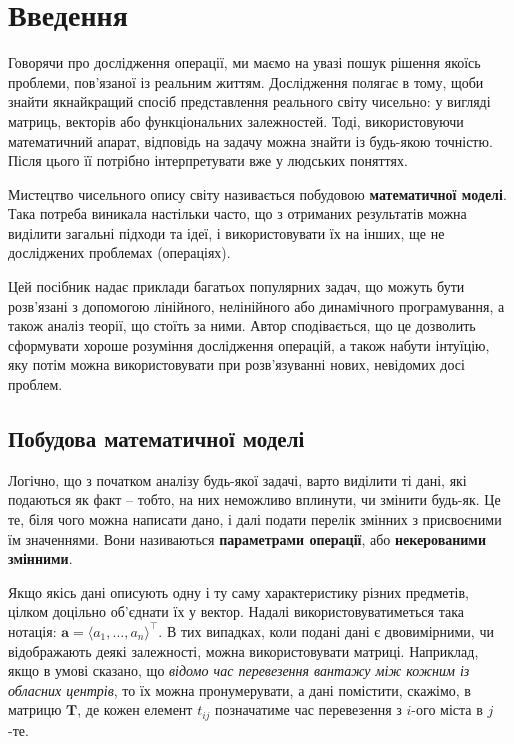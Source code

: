 \documentclass[../book.tex]{subfiles}
\begin{document}
\chapter{Введення}

Говорячи про \flqq{}дослідження операції\frqq{}, ми маємо на увазі пошук рішення якоїсь проблеми, пов'язаної із реальним життям. Дослідження полягає в тому, щоби знайти якнайкращий спосіб представлення реального світу чисельно: у вигляді матриць, векторів або функціональних залежностей. Тоді, використовуючи математичний апарат, відповідь на задачу можна знайти із будь-якою точністю. Після цього її потрібно інтерпретувати вже у \flqq{}людських\frqq{} поняттях.

Мистецтво чисельного опису світу називається побудовою \textbf{математичної моделі}. Така потреба виникала настільки часто, що з отриманих результатів можна виділити загальні підходи та ідеї, і використовувати їх на інших, ще не досліджених проблемах (операціях).

Цей посібник надає приклади багатьох популярних задач, що можуть бути розв'язані з допомогою лінійного, нелінійного або динамічного програмування, а також аналіз теорії, що стоїть за ними. Автор сподівається, що це дозволить сформувати хороше розуміння дослідження операцій, а також набути інтуїцію, яку потім можна використовувати при розв'язуванні нових, невідомих досі проблем.

\section{Побудова математичної моделі}

Логічно, що з початком аналізу будь-якої задачі, варто виділити ті дані, які подаються як факт -- тобто, на них неможливо вплинути, чи змінити будь-як. Це те, біля чого можна написати \flqq{}дано\frqq{}, і далі подати перелік змінних з присвоєними їм значеннями. Вони називаються \textbf{параметрами операції}, або \textbf{некерованими змінними}.

Якщо якісь дані описують одну і ту саму характеристику різних предметів, цілком доцільно об'єднати їх у вектор. Надалі використовуватиметься така нотація: $\mathbf{a} = \langle a_1, \ldots, a_n \rangle^\top$. В тих випадках, коли подані дані є двовимірними, чи відображають деякі залежності, можна використовувати матриці. Наприклад, якщо в умові сказано, що \textit{відомо час перевезення вантажу між кожним із обласних центрів}, то їх можна пронумерувати, а дані помістити, скажімо, в матрицю $\mathbf{T}$, де кожен елемент $t_{ij}$ позначатиме час перевезення з $i$-ого міста в $j$-те.
\end{document}
